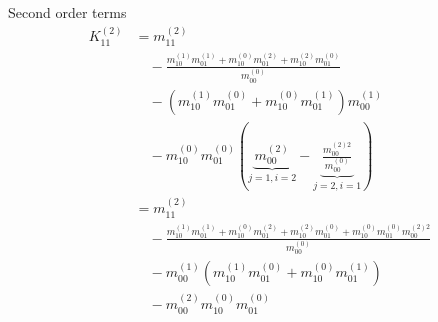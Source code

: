 \documentclass{article}
\begin{document}
Second order terms
\begin{equation}
  \begin{aligned}
    K_{11}^{(2)}
    &= m_{11}^{(2)} \\
    &\quad-
    \frac{
      m_{10}^{(1)}m_{01}^{(1)}
    + m_{10}^{(0)}m_{01}^{(2)}
    + m_{10}^{(2)}m_{01}^{(0)}
    }{m_{00}^{(0)}}\\
    &\quad
    -(m_{10}^{(1)}m_{01}^{(0)} + m_{10}^{(0)}m_{01}^{(1)}) m_{00}^{(1)}\\
    &\quad
    - m_{10}^{(0)}m_{01}^{(0)}
    \left(
      \underbrace{m_{00}^{(2)}}_{j=1,i=2}
      - \underbrace{\frac{m_{00}^{(2)2}}{m_{00}^{(0)}}}_{j=2,i=1}
    \right)\\
    &= m_{11}^{(2)} \\
    &\quad-
    \frac{
      m_{10}^{(1)}m_{01}^{(1)}
    + m_{10}^{(0)}m_{01}^{(2)}
    + m_{10}^{(2)}m_{01}^{(0)}
    + m_{10}^{(0)}m_{01}^{(0)}m_{00}^{(2)2}
    }{m_{00}^{(0)}}\\
    &\quad
    - m_{00}^{(1)}(m_{10}^{(1)}m_{01}^{(0)} + m_{10}^{(0)}m_{01}^{(1)}) \\
    &\quad
    - m_{00}^{(2)}m_{10}^{(0)}m_{01}^{(0)}
  \end{aligned}
\end{equation}
\end{document}
